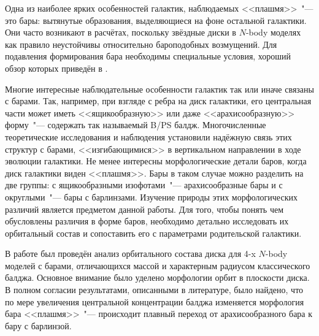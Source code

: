 \documentclass{trnotes}
\begin{document}
Одна из наиболее ярких особенностей галактик, наблюдаемых <<плашмя>>~"--- это бары:
вытянутые образования, выделяющиеся на фоне остальной галактики.
Они часто возникают в расчётах, поскольку звёздные диски в $N$-body моделях 
как правило неустойчивы относительно бароподобных возмущений.
 Для подавления формирования бара необходимы специальные условия, хороший обзор которых приведён 
в \citet{sellwood2019}.

Многие интересные наблюдательные особенности галактик так или иначе связаны с барами. 
Так, например, при взгляде с ребра на диск галактики, его центральная части может иметь 
<<ящикообразную>> или даже <<арахисообразную>> форму~"--- содержать так называемый B/PS балдж. 
Многочисленные теоретические исследования и наблюдения установили надёжную связь этих структур с барами, <<изгибающимися>> в вертикальном направлении в ходе эволюции галактики.
Не менее интересны морфологические детали баров, когда диск галактики виден <<плашмя>>. Бары в таком случае можно разделить на две 
группы: с ящикообразными изофотами~"--- арахисообразные бары и с округлыми~"--- бары с барлинзами. 
Изучение природы этих морфологических различий является предметом данной работы.
Для того, чтобы понять чем обусловлены различия в форме баров, необходимо детально исследовать их орбитальный состав
и сопоставить его с параметрами родительской галактики.

В работе был проведён анализ орбитального состава диска для 4-x $N$-body моделей с барами,
отличающихся массой и характерным радиусом классического балджа. Основное внимание было уделено морфологии орбит в плоскости диска. 
В полном согласии результатами, описанными в литературе, было найдено, что по мере увеличения центральной концентрации балджа 
изменяется морфология бара <<плашмя>>~"--- происходит плавный переход от арахисообразного бара к бару с барлинзой.
\end{document}
